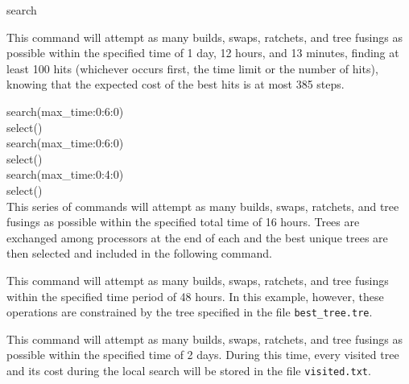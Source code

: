 \begin{command}{search}{}
\begin{arguments}
\end{arguments}


\begin{poyexamples}

{This command will attempt as many builds, swaps, ratchets, and tree
fusings as possible within the specified time of 1 day, 12 hours, and 13
minutes, finding at least 100 hits (whichever occurs first, the time
limit or the number of hits), knowing that the expected cost of the
best hits is at most 385 steps.}

{{search(max\_time:0:6:0)}\\
{select()}\\
{search(max\_time:0:6:0)}\\
{select()}\\
{search(max\_time:0:4:0)}\\
{select()}\\
{This series of commands will attempt as many builds, swaps, ratchets, and tree
fusings as possible within the specified total time of 16 hours. Trees are exchanged among
processors at the end of each  and the best unique trees
are then selected and included in the following
 command.}}

{This command will attempt as many builds, swaps, ratchets, and tree
fusings within the specified time period of 48 hours. In this example, however, these 
operations are constrained by the tree specified in the file \texttt{best\_tree.tre}.} 

{This command will attempt as many builds, swaps, ratchets, and tree
fusings as possible within the specified time of 2 days. During this 
time, every visited tree and its cost during the local search will be stored in the file
\texttt{visited.txt}.}

\end{poyexamples}

\begin{poyalso}
\end{poyalso}

\end{command}

